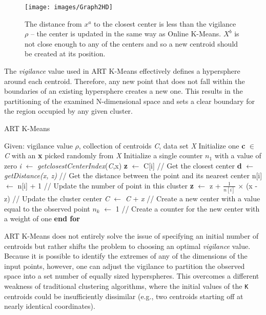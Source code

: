 \documentclass{l4proj}
\begin{document}
\begin{figure}[H]
	\centering
    \label{artGraph}
    \texttt{[image: images/Graph2HD]}
    \caption{The distance from $x^a$ to the closest center is less than the vigilance $\rho$ -- the center is updated in the same way as Online K-Means. $X^b$ is not close enough to any of the centers and so a new centroid should be created at its position.} 
\end{figure}

The \textit{vigilance} value used in ART K-Means effectively defines a hypersphere around each centroid. Therefore, any new point that does not fall within the boundaries of an existing hypersphere creates a new one. This results in the partitioning of the examined N-dimensional space and sets a clear boundary for the region occupied by any given cluster. 

\begin{algorithm}[H]
\caption{ART K-Means}\label{art-alg}
\begin{algorithmic}[1]
\State Given: vigilance value $\rho$, collection of centroids \textit{C}, data set \textit{X}
\State Initialize one \textbf{c} $\in$ \textit{C} with an \textbf{x} picked randomly from \textit{X}
\State Initialize a single counter $n_{1}$ with a value of zero
    \State \textit{i}  $\gets$ \textit{getclosestCenterIndex}(\textit{C},x)
    \State \textbf{z}  $\gets$ C[i] \hspace{2.35cm} // Get the closest center
    \State \textbf{d} $\gets$ \textit{getDistance(x, z)} \hspace{0.3cm} // Get the distance between the point and its nearest center
        \State n[i] $\gets$ n[i] + 1 \hspace{1.3cm} // Update the number of point in this cluster
        \State \textbf{z} $\gets$ z + $\frac{1}{n[i]}$ $\times$ (x - z) \hspace{0.35cm} // Update the cluster center
    \Else
        \State \textit{C} $\gets$ \textit{C} + \textit{x} \hspace{0.55cm} // Create a new center with a value equal to the observed point
        \State $n_k$ $\gets$ 1 \hspace{1cm} // Create a counter for the new center with a weight of one
    \EndIf
\EndFor
\State \textbf{end for}
\end{algorithmic}
\end{algorithm}

ART K-Means does not entirely solve the issue of specifying an initial number of centroids but rather shifts the problem to choosing an optimal \textit{vigilance} value. Because it is possible to identify the extremes of any of the dimensions of the input points, however, one can adjust the vigilance to partition the observed space into a set number of equally sized hyperspheres. This overcomes a different weakness of traditional clustering algorithms, where the initial values of the \texttt{K} centroids could be insufficiently dissimilar (e.g., two centroids starting off at nearly identical coordinates).
\end{document}

